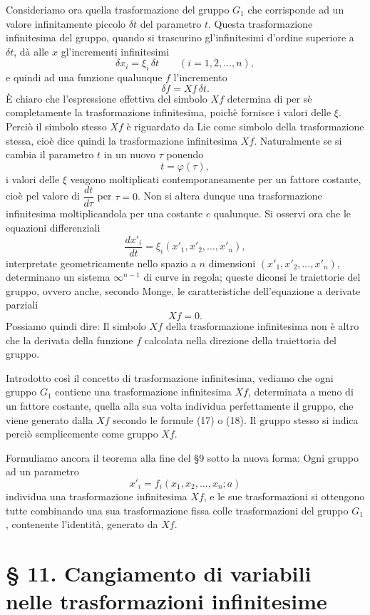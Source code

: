 \documentclass[11pt]{book}
\begin{document}
Consideriamo ora quella trasformazione del gruppo $G_1$ che corrisponde ad un valore infinitamente piccolo $\delta t$ del parametro $t$. Questa trasformazione infinitesima del gruppo, quando si trascurino gl'infinitesimi d'ordine superiore a $\delta t$, dà alle $x$ gl'incrementi infinitesimi
\[
 \delta x_i=\xi_i\,\delta t\qquad (i=1,2,\ldots,n),
\]
e quindi ad una funzione qualunque $f$ l'incremento
\[
 \delta f=Xf\,\delta t.
\]
È chiaro che l'espressione effettiva del simbolo $Xf$ determina di per sè completamente la trasformazione infinitesima, poichè fornisce i valori delle $\xi$. Perciò il simbolo stesso $Xf$ è riguardato da Lie come simbolo della trasformazione stessa, cioè dice quindi la trasformazione infinitesima $Xf$. Naturalmente se si cambia il parametro $t$ in un nuovo $\tau$ ponendo
\[
 t=\varphi(\tau),
\]
i valori delle $\xi$ vengono moltiplicati contemporaneamente per un fattore costante, cioè pel valore di $\dfrac{dt}{d\tau}$ per $\tau=0$. Non si altera dunque una trasformazione infinitesima moltiplicandola per una costante $c$ qualunque. Si osservi ora che le equazioni differenziali
\[
 \frac{dx'_i}{dt}=\xi_i(x'_1,x'_2,\ldots,x'_n),
\]
interpretate geometricamente nello spazio a $n$ dimensioni $(x'_1,x'_2,\ldots,x'_n)$, determinano un sistema $\infty^{n-1}$ di curve in regola; queste diconsi le traiettorie del gruppo, ovvero anche, secondo Monge, le caratteristiche dell'equazione a derivate parziali
\[
 Xf=0.
\]
Possiamo quindi dire: Il simbolo $Xf$ della trasformazione infinitesima non è altro che la derivata della funzione $f$ calcolata nella direzione della traiettoria del gruppo.

Introdotto così il concetto di trasformazione infinitesima, vediamo che ogni gruppo $G_1$ contiene una trasformazione infinitesima $Xf$, determinata a meno di un fattore costante, quella alla sua volta individua perfettamente il gruppo, che viene generato dalla $Xf$ secondo le formule (17) o (18). Il gruppo stesso si indica perciò semplicemente come gruppo $Xf$.

Formuliamo ancora il teorema alla fine del \S{}9 sotto la nuova forma:
Ogni gruppo ad un parametro
\[
 x'_i=f_i(x_1,x_2,\ldots,x_n;a)
\]
individua una trasformazione infinitesima $Xf$, e le sue trasformazioni si ottengono tutte combinando una sua trasformazione fissa colle trasformazioni del gruppo $G_1$, contenente l'identità, generato da $Xf$.

\section*{\S{} 11. Cangiamento di variabili nelle trasformazioni infinitesime}
\end{document}
